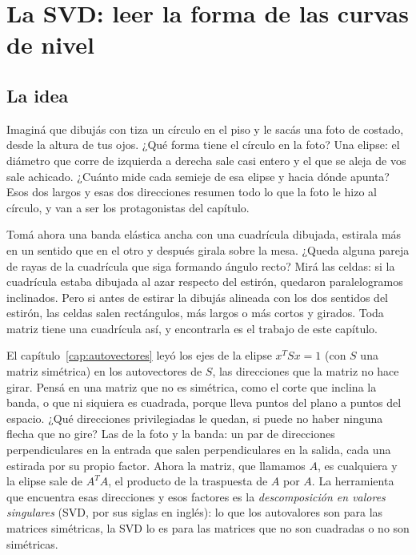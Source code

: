 \chapter{La SVD: leer la forma de las curvas de nivel}\label{cap:svd}

\section{La idea}

Imaginá que dibujás con tiza un círculo en el piso y le sacás una foto de costado, desde la
altura de tus ojos.
¿Qué forma tiene el círculo en la foto?
Una elipse: el diámetro que corre de izquierda a derecha sale casi entero y el que se aleja de
vos sale achicado.
¿Cuánto mide cada semieje de esa elipse y hacia dónde apunta?
Esos dos largos y esas dos direcciones resumen todo lo que la foto le hizo al círculo, y van a
ser los protagonistas del capítulo.

Tomá ahora una banda elástica ancha con una cuadrícula dibujada, estirala más en un sentido que
en el otro y después girala sobre la mesa.
¿Queda alguna pareja de rayas de la cuadrícula que siga formando ángulo recto?
Mirá las celdas: si la cuadrícula estaba dibujada al azar respecto del estirón, quedaron
paralelogramos inclinados. Pero si antes de estirar la dibujás alineada con los dos sentidos
del estirón, las celdas salen rectángulos, más largos o más cortos y girados. Toda matriz tiene
una cuadrícula así, y encontrarla es el trabajo de este capítulo.

El capítulo~\ref{cap:autovectores} leyó los ejes de la elipse \(x^TSx=1\) (con \(S\) una
matriz simétrica) en los autovectores de \(S\), las direcciones que la matriz no hace girar.
Pensá en una matriz que no es simétrica, como el corte que inclina la banda, o que ni siquiera
es cuadrada, porque lleva puntos del plano a puntos del espacio.
¿Qué direcciones privilegiadas le quedan, si puede no haber ninguna flecha que no gire?
Las de la foto y la banda: un par de direcciones perpendiculares en la entrada que salen
perpendiculares en la salida, cada una estirada por su propio factor. Ahora la matriz, que
llamamos \(A\), es cualquiera y la elipse sale de \(A^TA\), el producto de la traspuesta de
\(A\) por \(A\). La herramienta que encuentra esas direcciones y esos
factores es la \emph{descomposición en valores singulares} (SVD, por sus siglas en inglés): lo
que los autovalores son para las matrices simétricas, la SVD lo es para las matrices que no son
cuadradas o no son simétricas.

